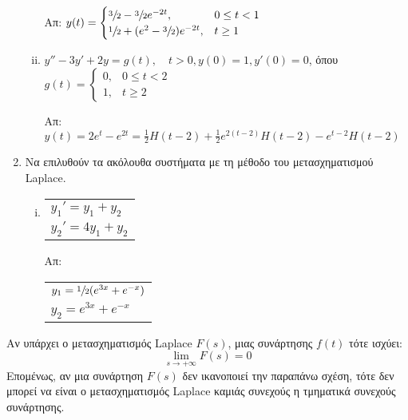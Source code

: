 \begin{enumerate}
\begin{enumerate}[i)]
        \hfill Απ: $y(t)=
        \begin{cases} 
          \sfrac{3}{2}-\sfrac{3}{2}e^{-2t},& 0\leq t<1 \\ 
          \sfrac{1}{2}+(e^2-\sfrac{3}{2})e^{-2t}, & t\geq 1
        \end{cases}$

      \item $y''-3y'+2y=g(t),\quad t>0, y(0)=1, y'(0)=0$, 
        όπου $g(t)=
        \begin{cases} 
          0, & 0\leq t<2 \\ 1, & t\geq 2
        \end{cases}$

        \hfill Απ: $y(t)=2e^t-e^{2t}=\frac{1}{2}H(t-2)+
        \frac{1}{2}e^{2(t-2)}H(t-2)-e^{t-2}H(t-2)$
    \end{enumerate}

  \item Να επιλυθούν τα ακόλουθα συστήματα με τη μέθοδο του μετασχηματισμού Laplace.
    \begin{enumerate}[i)]
      \item 
        \begin{tabular}{l} 
          $y_1'=y_1+y_2$ \\ $y_2'=4y_1+y_2$
        \end{tabular} 
        \hfill Απ: 
        \begin{tabular}{l} 
          $y_1=\sfrac{1}{2}(e^{3x}+e^{-x})$ \\ $y_2=e^{3x}+e^{-x}$
        \end{tabular}
    \end{enumerate}
\end{enumerate}

\vspace{\baselineskip}


\begin{rem}
  Αν υπάρχει ο μετασχηματισμός Laplace $F(s)$, μιας 
  συνάρτησης $f(t)$ τότε ισχύει:
  \[
    \lim\limits_{s\to+\infty}F(s)=0
  \]
  Επομένως, αν μια συνάρτηση $F(s)$ δεν ικανοποιεί την παραπάνω σχέση, τότε δεν 
  μπορεί να είναι ο μετασχηματισμός Laplace καμιάς συνεχούς η τμηματικά 
  συνεχούς συνάρτησης.
\end{rem}



